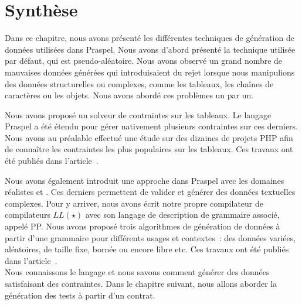\section{Synthèse}
\label{section:data:summary}

Dans ce chapitre, nous avons présenté les différentes techniques de génération
de données utilisées dans Praspel. Nous avons d'abord présenté la technique
utilisée par défaut, qui est pseudo-aléatoire. Nous avons observé un grand
nombre de mauvaises données générées qui introduisaient du rejet lorsque nous
manipulions des données structurelles ou complexes, comme les tableaux, les
chaînes de caractères ou les objets. Nous avons abordé ces problèmes un par un.

Nous avons proposé un solveur de contraintes sur les tableaux. Le langage
Praspel a été étendu pour gérer nativement plusieurs contraintes sur ces
derniers. Nous avons au préalable effectué une étude sur des dizaines de projets
PHP afin de connaître les contraintes les plus populaires sur les tableaux. Ces
travaux ont été publiés dans l'article~.

Nous avons également introduit une approche 
dans Praspel avec les domaines réalistes  et . Ces
derniers permettent de valider et générer des données textuelles complexes.
Pour y arriver, nous avons écrit notre propre compilateur de compilateurs
$LL(\star)$ avec son langage de description de grammaire associé, appelé PP.
Nous avons proposé trois algorithmes de génération de données à partir d'une
grammaire pour différents usages et contextes~: des données variées, aléatoires,
de taille fixe, bornée ou encore libre etc. Ces travaux ont été publiés dans
l'article~. \\

Nous connaissons le langage et nous savons comment générer des données
satisfaisant des contraintes. Dans le chapitre suivant, nous allons aborder la
génération des tests à partir d'un contrat.
